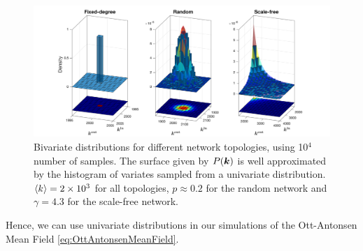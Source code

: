 \begin{figure}[ht]
\centering
\includegraphics[trim=2.5cm 0cm 2.5cm 0cm, clip=true, width = \textwidth]{../Figures/Distributions/2D.png}
\caption{Bivariate distributions for different network topologies, using 10$^4$ number of samples. The surface given by $P({\boldsymbol{k}})$ is well approximated by the histogram of variates sampled from a univariate distribution. ${\langle k\rangle} =  2 \times 10^3$ for all topologies, $p \approx 0.2$ for the random network and $\gamma = 4.3$ for the scale-free network.}
\label{fig:2Ddistributions}
\end{figure}
Hence, we can use univariate distributions in our simulations of the Ott-Antonsen Mean Field \eqref{eq:OttAntonsenMeanField}.


